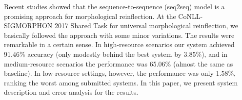 Recent studies showed that the sequence-to-sequence (seq2seq) model is a promising approach for morphological reinflection. At the CoNLL-SIGMORPHON 2017 Shared Task for universal morphological reinflection, we basically followed the approach with some minor variations. The results were remarkable in a certain sense. In high-resource scenarios our system achieved 91.46\% accuracy (only modestly behind the best system by 3.85\%), and in medium-resource scenarios the performance was 65.06\% (almost the same as baseline). In low-resource settings, however, the performance was only 1.58\%, ranking the worst among submitted systems. In this paper, we present system description and error analysis for the results.
